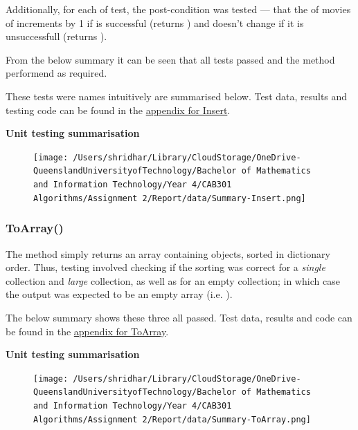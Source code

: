 \documentclass[a4paper]{article}
\begin{document}
\noindent
Additionally, for each of test, the post-condition was tested --- that the  of movies of increments by 1 if  is successful (returns ) and doesn't change if it is unsuccessfull (returns ).
\vspace{2mm}

\noindent
From the below summary it can be seen that all tests passed and the method performend as required.
\vspace{4mm}

\noindent
These tests were names intuitively are summarised below. Test data, results and testing code can be found in the \hyperlink{subsubsection.5.2.2}{appendix for Insert}.
\vspace{1mm}

\noindent
\textbf{Unit testing summarisation}
\begin{figure}[H]
   \texttt{[image: /Users/shridhar/Library/CloudStorage/OneDrive-QueenslandUniversityofTechnology/Bachelor of Mathematics and Information Technology/Year 4/CAB301 Algorithms/Assignment 2/Report/data/Summary-Insert.png]}
\end{figure}

\subsubsection{ToArray{()}}
The  method simply returns an  array containing  objects, sorted in dictionary order. Thus, testing involved checking if the sorting was correct for a \textit{single} collection and \textit{large} collection, as well as for an empty collection; in which case the output was expected to be an empty  array (i.e. ). 
\vspace{1mm}

\noindent
The below summary shows these three all passed. Test data, results and code can be found in the \hyperlink{subsubsection.5.2.3}{appendix for ToArray}.
\vspace{2mm}

\noindent
\textbf{Unit testing summarisation}
\begin{figure}[H]
   \texttt{[image: /Users/shridhar/Library/CloudStorage/OneDrive-QueenslandUniversityofTechnology/Bachelor of Mathematics and Information Technology/Year 4/CAB301 Algorithms/Assignment 2/Report/data/Summary-ToArray.png]}
\end{figure}
\pagebreak
\end{document}
